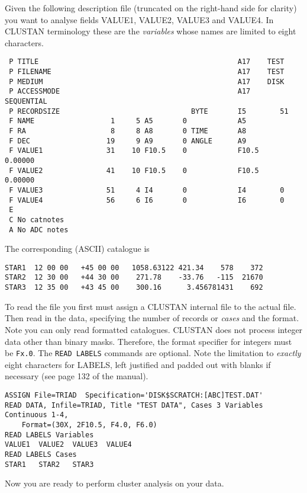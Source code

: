 Given the following description file (truncated on the right-hand side
for clarity) you want to analyse fields VALUE1,
VALUE2, VALUE3 and VALUE4.  In {\small CLUSTAN} terminology these are
the {\em variables} whose names are limited to eight characters.
\begin{verbatim}
 P TITLE                                               A17    TEST              
 P FILENAME                                            A17    TEST              
 P MEDIUM                                              A17    DISK              
 P ACCESSMODE                                          A17    SEQUENTIAL        
 P RECORDSIZE                               BYTE       I5        51             
 F NAME                  1     5 A5       0            A5                       
 F RA                    8     8 A8       0 TIME       A8                       
 F DEC                  19     9 A9       0 ANGLE      A9                       
 F VALUE1               31    10 F10.5    0            F10.5     0.00000        
 F VALUE2               41    10 F10.5    0            F10.5     0.00000        
 F VALUE3               51     4 I4       0            I4        0              
 F VALUE4               56     6 I6       0            I6        0              
 E                                                                              
 C No catnotes
 A No ADC notes                                                                 
\end{verbatim}
The corresponding (ASCII) catalogue is 
\begin{verbatim}
STAR1  12 00 00   +45 00 00   1058.63122 421.34    578    372   
STAR2  12 30 00   +44 30 00    271.78    -33.76   -115  21670 
STAR3  12 35 00   +43 45 00    300.16      3.456781431    692 
\end{verbatim}
To read the file you first must assign a {\small CLUSTAN} internal
file to the actual file.  Then read in the data, specifying the number
of records or {\em cases} and the format.  Note you can only read
formatted catalogues. {\small CLUSTAN} does not process integer data
other than binary masks.  Therefore, the format specifier for integers must be 
{\tt Fx.0}. The {\tt READ LABELS} commands are optional.  Note the 
limitation to {\em exactly} eight characters for LABELS, left justified and
padded out with blanks if necessary (see page 132 of the manual).

\begin{verbatim}
ASSIGN File=TRIAD  Specification='DISK$SCRATCH:[ABC]TEST.DAT'
READ DATA, Infile=TRIAD, Title "TEST DATA", Cases 3 Variables Continuous 1-4,
    Format=(30X, 2F10.5, F4.0, F6.0)
READ LABELS Variables
VALUE1  VALUE2  VALUE3  VALUE4
READ LABELS Cases
STAR1   STAR2   STAR3   
\end{verbatim}
Now you are ready to perform cluster analysis on your data. 

